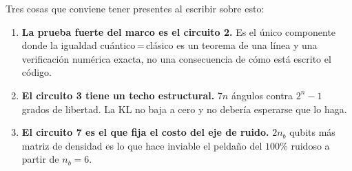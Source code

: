 \documentclass[11pt,a4paper]{article}
\begin{document}
\medskip
\noindent
Tres cosas que conviene tener presentes al escribir sobre esto:

\begin{enumerate}[leftmargin=1.6em]
  \item \textbf{La prueba fuerte del marco es el circuito 2.} Es el único
    componente donde la igualdad cuántico\,=\,clásico es un teorema de una
    línea y una verificación numérica exacta, no una consecuencia de cómo
    está escrito el código.
  \item \textbf{El circuito 3 tiene un techo estructural.} $7n$ ángulos
    contra $2^n-1$ grados de libertad. La KL no baja a cero y no debería
    esperarse que lo haga.
  \item \textbf{El circuito 7 es el que fija el costo del eje de ruido.}
    $2n_b$ qubits más matriz de densidad es lo que hace inviable el peldaño
    del $100\%$ ruidoso a partir de $n_b = 6$.
\end{enumerate}
\end{document}
